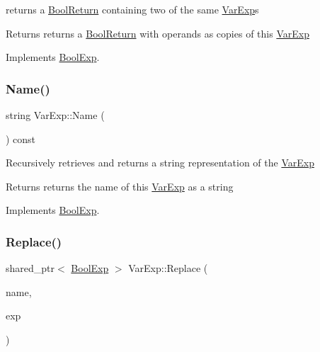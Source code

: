 returns a \mbox{\hyperlink{structBoolReturn}{Bool\+Return}} containing two of the same \mbox{\hyperlink{classVarExp}{Var\+Exp}}\textquotesingle{}s \begin{DoxyReturn}{Returns}
returns a \mbox{\hyperlink{structBoolReturn}{Bool\+Return}} with operands as copies of this \mbox{\hyperlink{classVarExp}{Var\+Exp}} 
\end{DoxyReturn}


Implements \mbox{\hyperlink{classBoolExp_a0e5d4a241332ae72d083645e4b71e0e6}{Bool\+Exp}}.

\mbox{\label{classVarExp_af50f77454d193ebfd7633f5f20becaf4}} 
\subsubsection{\texorpdfstring{Name()}{Name()}}
{\footnotesize\ttfamily string Var\+Exp\+::\+Name (\begin{DoxyParamCaption}{ }\end{DoxyParamCaption}) const\hspace{0.3cm}{\ttfamily [virtual]}}

Recursively retrieves and returns a string representation of the \mbox{\hyperlink{classVarExp}{Var\+Exp}} \begin{DoxyReturn}{Returns}
returns the name of this \mbox{\hyperlink{classVarExp}{Var\+Exp}} as a string 
\end{DoxyReturn}


Implements \mbox{\hyperlink{classBoolExp_a3fdb64a9b8fd54e33d755ff4a577d11a}{Bool\+Exp}}.

\mbox{\label{classVarExp_a0b716a76069a7fad3b99b86a9bd9d331}} 
\subsubsection{\texorpdfstring{Replace()}{Replace()}}
{\footnotesize\ttfamily shared\+\_\+ptr$<$ \mbox{\hyperlink{classBoolExp}{Bool\+Exp}} $>$ Var\+Exp\+::\+Replace (\begin{DoxyParamCaption}\item[{string}]{name,  }\item[{\mbox{\hyperlink{classBoolExp}{Bool\+Exp}} \&}]{exp }\end{DoxyParamCaption})\hspace{0.3cm}{\ttfamily [virtual]}}

